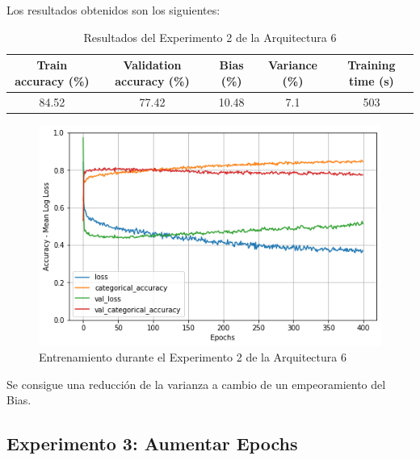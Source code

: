 \documentclass{article}
\begin{document}
            Los resultados obtenidos son los siguientes: 
            \begin{table}[!h]
				\begin{center}
					\begin{tabular}{| c | c | c | c | c |}
						\textbf{Train accuracy (\%)} & \textbf{Validation accuracy (\%)} & \textbf{Bias (\%)} & \textbf{Variance (\%)} & \textbf{Training time (s)} \\ \hline
						 84.52 & 77.42 & 10.48  & 7.1 & 503 \\ \hline
					\end{tabular}
					\caption{Resultados del Experimento 2 de la Arquitectura 6}
					\label{tab:res-b-a6-e2}
				\end{center}
			\end{table}
            \begin{figure}[!h]
				\begin{center}
					\includegraphics[scale=0.5]{b-tr-a6-e2.png}		
					\caption{Entrenamiento durante el Experimento 2 de la Arquitectura 6}	
					\label{b-tr-a6-e2}
				\end{center}
			\end{figure}
            Se consigue una reducci\'on de la varianza a cambio de un empeoramiento del Bias. 
            
        \subsection{Experimento 3: Aumentar Epochs}
        \label{b-s-a6-e3}
\end{document}
